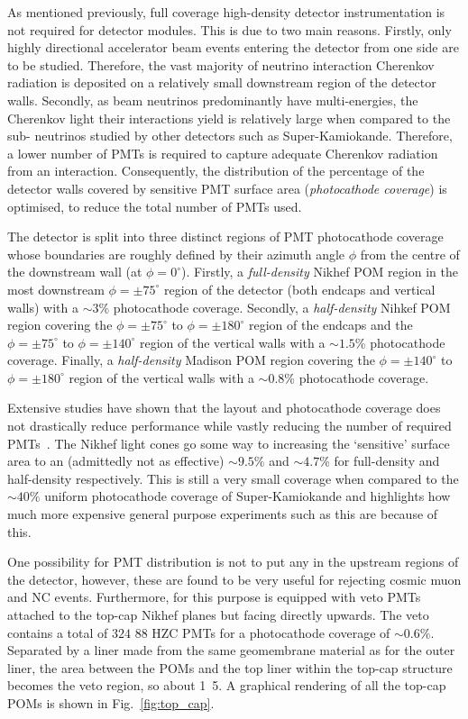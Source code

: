 As mentioned previously, full coverage high-density detector instrumentation is not required for
\chips detector modules. This is due to two main reasons. Firstly, only highly directional
accelerator beam events entering the detector from one side are to be studied. Therefore, the vast
majority of neutrino interaction Cherenkov radiation is deposited on a relatively small downstream
region of the detector walls. Secondly, as beam neutrinos predominantly have multi-\GeV energies,
the Cherenkov light their interactions yield is relatively large when compared to the sub-\GeV
neutrinos studied by other detectors such as Super-Kamiokande. Therefore, a lower number of PMTs
is required to capture adequate Cherenkov radiation from an interaction. Consequently, the
distribution of the percentage of the detector walls covered by sensitive PMT surface area
(\emph{photocathode coverage}) is optimised, to reduce the total number of PMTs used.

The \chipsfive detector is split into three distinct regions of PMT photocathode coverage whose
boundaries are roughly defined by their azimuth angle $\phi$ from the centre of the downstream
wall (at $\phi=0^{\circ}$). Firstly, a \emph{full-density} Nikhef POM region in the most
downstream $\phi=\pm75^{\circ}$ region of the detector (both endcaps and vertical walls) with a
$\sim3\%$ photocathode coverage. Secondly, a \emph{half-density} Nihkef POM region covering the
$\phi=\pm75^{\circ}$ to $\phi=\pm180^{\circ}$ region of the endcaps and the $\phi=\pm75^{\circ}$
to $\phi=\pm140^{\circ}$ region of the vertical walls with a $\sim1.5\%$ photocathode coverage.
Finally, a \emph{half-density} Madison POM region covering the $\phi=\pm140^{\circ}$ to
$\phi=\pm180^{\circ}$ region of the vertical walls with a $\sim0.8\%$ photocathode coverage.

Extensive studies have shown that the \chipsfive layout and photocathode coverage does not
drastically reduce performance while vastly reducing the number of required PMTs~\cite{blake2016}.
The Nikhef light cones go some way to increasing the `sensitive' surface area to an (admittedly
not as effective) $\sim9.5\%$ and $\sim4.7\%$ for full-density and half-density respectively. This
is still a very small coverage when compared to the $\sim40\%$ uniform photocathode coverage of
Super-Kamiokande and highlights how much more expensive general purpose experiments such as this
are because of this.

One possibility for PMT distribution is not to put any in the upstream regions of the detector,
however, these are found to be very useful for rejecting cosmic muon and NC events. Furthermore,
for this purpose \chipsfive is equipped with veto PMTs attached to the top-cap Nikhef planes but
facing directly upwards. The veto contains a total of $324$ \unit{88}{} HZC PMTs for a
photocathode coverage of $\sim0.6\%$. Separated by a liner made from the same geomembrane material
as for the outer liner, the area between the POMs and the top liner within the top-cap structure
becomes the veto region, so about \unit{1.5}{}. A graphical rendering of all the top-cap
POMs is shown in Fig.~\ref{fig:top_cap}.

